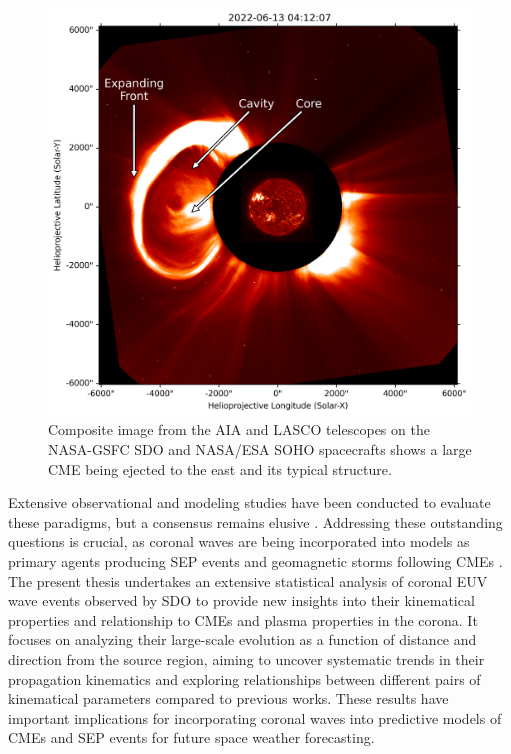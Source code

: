 \begin{figure}[!htp]
	\centerline{\includegraphics[width=0.8\columnwidth]{chapter1/figs/AIA_LASCO_composite_2022613.png}}
	\caption{Composite image from the AIA and LASCO telescopes on the NASA-GSFC SDO and NASA/ESA SOHO spacecrafts shows a large CME being ejected to the east and its typical structure.}
	\label{fig_cme}
\end{figure}

Extensive observational and modeling studies have been conducted to evaluate these paradigms, but a consensus remains elusive \citep{patsourakos_2012, long_2017}. Addressing these outstanding questions is crucial, as coronal waves are being incorporated into models as primary agents producing SEP events and geomagnetic storms following CMEs \citep{rouillard_2012, park_2013}. The present thesis undertakes an extensive statistical analysis of coronal EUV wave events observed by SDO to provide new insights into their kinematical properties and relationship to CMEs and plasma properties in the corona. It focuses on analyzing their large-scale evolution as a function of distance and direction from the source region, aiming to uncover systematic trends in their propagation kinematics and exploring relationships between different pairs of kinematical parameters compared to previous works. These results have important implications for incorporating coronal waves into predictive models of CMEs and SEP events for future space weather forecasting.

